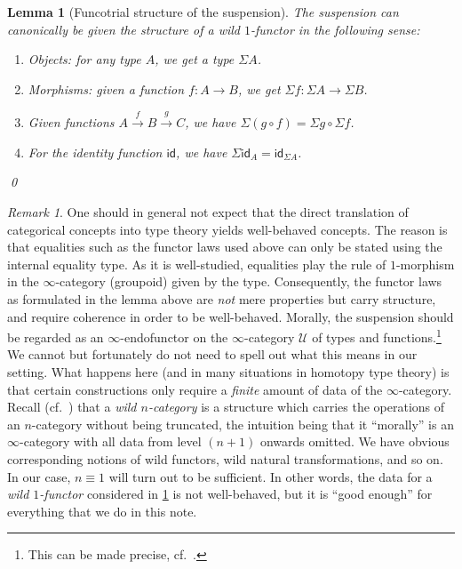 \documentclass[11pt,a4paper,oneside,reqno]{amsart}
\newtheorem{lemma}[theorem]{Lemma}
\theoremstyle{definition}
\theoremstyle{remark}
\newtheorem{remark}[theorem]{Remark}
\newcommand{\UU}{\mathcal{U}}
\newcommand{\idf}{\mathsf{id}}
\begin{document}
\begin{lemma}[Funcotrial structure of the suspension] \label{lem:Susp-is-functor}
 The suspension can canonically be given the structure of a \emph{wild $1$-functor} in the following sense:
 \begin{enumerate}
  \item \emph{Objects:} for any type $A$, we get a type $\Sigma A$.
  \item \emph{Morphisms:} given a function $f : A \to B$, we get $\Sigma f : \Sigma A \to \Sigma B$.
  \item Given functions $A \xrightarrow f B \xrightarrow g C$, we have $\Sigma(g \circ f) = \Sigma g \circ \Sigma f$. \label{eq:susp-law1}
  \item For the identity function $\idf$, we have $\Sigma \idf_A = \idf_{\Sigma A}$. \label{eq:susp-law2}
 \end{enumerate}
 \qed
\end{lemma}

\begin{remark} \label{rem:wildness}
One should in general not expect that the direct translation of categorical concepts into type theory yields well-behaved concepts.
The reason is that equalities such as the functor laws used above can only be stated using the internal equality type.
As it is well-studied, equalities play the rule of $1$-morphism in the $\infty$-category (groupoid) given by the type.
Consequently, the functor laws as formulated in the lemma above are \emph{not} mere properties but carry structure, and require coherence in order to be well-behaved.
Morally, the suspension should be regarded as an $\infty$-endofunctor on the $\infty$-category $\UU$ of types and functions.\footnote{This can be made precise, cf.\ \cite{ann-cap-kra:two-level}.}
We cannot but fortunately do not need to spell out what this means in our setting.
What happens here (and in many situations in homotopy type theory) is that certain constructions only require a \emph{finite} amount of data of the $\infty$-category.
Recall (cf.\ \cite{capKra_semisegal}) that a \emph{wild $n$-category} is a structure which carries the operations of an $n$-category without being truncated, the intuition being that it ``morally'' is an $\infty$-category with all data from level $(n+1)$ onwards omitted.
We have obvious corresponding notions of wild functors, wild natural transformations, and so on.
In our case, $n \equiv 1$ will turn out to be sufficient.
In other words, the data for a \emph{wild $1$-functor} considered in \cref{lem:Susp-is-functor} is not well-behaved, but it is ``good enough'' for everything that we do in this note.
\end{remark}
\end{document}
